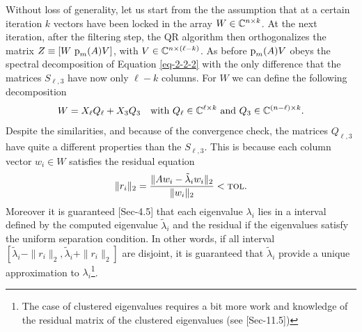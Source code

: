 Without loss of generality, let us start from the the assumption that at a certain iteration $k$ vectors have been locked in the array $W \in \mathbb{C}^{n\times k}$. At the next iteration, after the filtering step, the QR algorithm then orthogonalizes the matrix $Z \equiv [W\ {\textrm p}_{m} (A) V]$, with $V \in \mathbb{C}^{n\times(\ell-k)}$. As before ${\textrm p}_{m} (A)V$ obeys the spectral decomposition of Equation \ref{eq-2-2-2} with the only difference that the matrices $S_{\ell,3}$ have now only $\ell-k$ columns. For $W$ we can define the following decomposition
\begin{equation}
    W = X_\ell Q_\ell + X_3 Q_3 \quad \textrm{with}\ Q_\ell \in \mathbb{C}^{\ell\times k}\ \textrm{and}\ Q_3 \in \mathbb{C}^{(n-\ell)\times k}.
\end{equation}
Despite the similarities, and because of the convergence check, the matrices $Q_{\ell,3}$ have quite a different properties than the $S_{\ell,3}$. This is because each column vector $w_i \in W$ satisfies the residual equation   
\begin{equation}
\label{eq:res}
\|r_i\|_2 = \frac{\|Aw_i - \tilde{\lambda}_i w_i\|_2}{\|w_i\|_2} < \textsc{tol}.
\end{equation}
Moreover it is guaranteed \cite{Parlett:1998tv}[Sec-4.5] that each eigenvalue $\lambda_i$ lies in a interval defined by the computed eigenvalue $\tilde{\lambda}_i$ and the residual if the eigenvalues satisfy the uniform separation condition. In other words, if all interval $[\tilde{\lambda}_i - \|r_i\|_2, \tilde{\lambda}_i + \|r_i\|_2]$ are disjoint, it is guaranteed that $\tilde{\lambda}_i$ provide a unique approximation to $\lambda_i$\footnote{The case of clustered eigenvalues requires a bit more work and knowledge of the residual matrix of the clustered eigenvalues (see \cite{Parlett:1998tv}[Sec-11.5])}.

